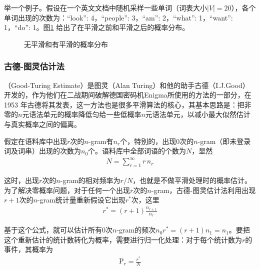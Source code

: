 \parinterval 举一个例子。假设在一个英文文档中随机采样一些单词（词表大小$|V|=20$），各个单词出现的次数为：``look'': 4，``people'': 3，``am'': 2，``what'': 1，``want'': 1，``do'': 1。图\ref{fig:2-19} 给出了在平滑之前和平滑之后的概率分布。

\begin{figure}[htp]
    \centering
 	
	\caption{无平滑和有平滑的概率分布}
    \label{fig:2-19}
\end{figure}


\subsubsection{古德-图灵估计法}

\vspace{-0.5em}
（Good-Turing Estimate）是图灵（Alan Turing）和他的助手古德（I.J.Good）开发的，作为他们在二战期间破解德国密码机Enigma所使用的方法的一部分，在1953 年古德将其发表，这一方法也是很多平滑算法的核心，其基本思路是：把非零的$n$元语法单元的概率降低匀给一些低概率$n$元语法单元，以减小最大似然估计与真实概率之间的偏离\cite{good1953population}\cite{gale1995good}。

\parinterval 假定在语料库中出现$r$次的$n$-gram有$n_r$个，特别的，出现0次的$n$-gram（即未登录词及词串）出现的次数为$n_0$个。语料库中全部词语的个数为$N$，显然
\begin{eqnarray}
N = \sum_{r=1}^{\infty}{r\,n_r}
\label{eq:2-28}
\end{eqnarray}

\parinterval 这时，出现$r$次的$n$-gram的相对频率为$r/N$，也就是不做平滑处理时的概率估计。为了解决零概率问题，对于任何一个出现$r$次的$n$-gram，古德-图灵估计法利用出现$r+1$次的$n$-gram统计量重新假设它出现$r^*$次，这里
\begin{eqnarray}
r^* = (r + 1)\frac{n_{r + 1}}{n_r}
\label{eq:2-29}
\end{eqnarray}

\parinterval 基于这个公式，就可以估计所有0次$n$-gram的频次$n_0 r^*=(r+1)n_1=n_1$。要把这个重新估计的统计数转化为概率，需要进行归一化处理：对于每个统计数为$r$的事件，其概率为
\begin{eqnarray}
\textrm{P}_r=\frac{r^*}{N}
\label{eq:2-30}
\end{eqnarray}
\vspace{5em}

